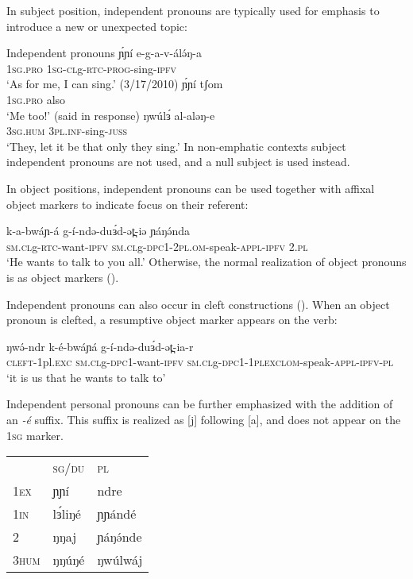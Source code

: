 In subject position, independent pronouns are typically used for emphasis to introduce a new or unexpected topic:

\ea Independent pronouns
	\ea \gll ɲ́ɲí e-g-a-v-álə́ŋ-a\\
			1\textsc{sg}.\textsc{pro} 1\textsc{sg}-\textsc{cl}g-\textsc{rtc}-\textsc{prog}-sing-\textsc{ipfv}\\
		\glt `As for me, I can sing.'	 (3/17/2010)
	\ex \gll ɲ́ɲí tʃom\\
			1\textsc{sg}.\textsc{pro} also\\
		\glt	`Me too!' 	(said in response)
	\ex \gll ŋwúlɜ́ al-aləŋ-e		\\
			 3\textsc{sg}.\textsc{hum} 3\textsc{pl}.\textsc{inf}-sing-\textsc{juss}\\
		\glt `They, let it be that only they sing.'
	\z
\z
In non-emphatic contexts subject independent pronouns are not used, and a null subject is used instead.

In object positions, independent pronouns can be used together with affixal object markers to indicate focus on their referent:

\ea 
	\gll	 k-a-bwáɲ-á   g-í-ndə-duɜ́d-ət̪-iə                    ɲáŋə́nda\\
	\textsc{sm}.\textsc{cl}g-\textsc{rtc}-want-\textsc{ipfv}   \textsc{sm}.\textsc{cl}g-\textsc{dpc}1-2\textsc{pl.om}-speak-\textsc{appl}-\textsc{ipfv}  2.\textsc{pl}\\
	\glt	‘He wants to talk to you all.’
\z
Otherwise, the normal realization of object pronouns is as object markers (). 
	
Independent pronouns can also occur in cleft constructions (). When an object pronoun is clefted, a resumptive object marker appears on the verb:

\ea	\gll	ŋwə́-ndr            k-é-bwáɲá                    g-í-ndə-duɜ́d-ət̪-ia-r\\
	\textsc{cleft}-1pl.\textsc{exc}  \textsc{sm.cl}g-\textsc{dpc}1-want-\textsc{ipfv}  \textsc{sm.cl}g-\textsc{dpc}1-1\textsc{plexclom}-speak-\textsc{appl}-\textsc{ipfv}-\textsc{pl}\\
	\glt	‘it is us that he wants to talk to’
\z

Independent personal pronouns can be further emphasized with the addition of an \textit{-é} suffix. This suffix is realized as [j] following [a], and does not appear on the 1\textsc{sg} marker. 

\ea 
\begin{tabular}[t]{lll}
		&	\textsc{sg}/\textsc{du} & \textsc{pl} \\
\textsc{1ex}		&	ɲɲí	& ndre\\
\textsc{1in }	&	lɜ́liŋé & ɲɲándé\\
\textsc{2	}	&	ŋŋaj	& ɲáŋə́nde \\
\textsc{3hum}	&	ŋŋúŋé & ŋwúlwáj\\
\end{tabular}
\z

